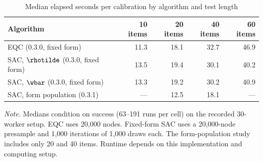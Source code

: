 \begin{table}[!htbp]
\centering
\caption{Median elapsed seconds per calibration by algorithm and test length}
\label{tab:runtime}
\small
\begin{tabular}{lrrrr}
\toprule
Algorithm & 10 items & 20 items & 40 items & 60 items \\
\midrule
EQC (0.3.0, fixed form) & 11.3 & 18.1 & 32.7 & 46.9 \\
SAC, $\rhotilde$ (0.3.0, fixed form) & 13.5 & 19.4 & 30.1 & 40.2 \\
SAC, $\wbar$ (0.3.0, fixed form) & 13.3 & 19.2 & 30.2 & 40.9 \\
SAC, form population (0.3.1) & --- & 12.5 & 18.1 & --- \\
\bottomrule
\end{tabular}

\smallskip
\begin{minipage}{0.95\textwidth}
\footnotesize
\emph{Note.} Medians condition on success (63--191 runs per cell) on the recorded 30-worker setup. EQC uses 20,000 nodes. Fixed-form SAC uses a 20,000-node presample and 1,000 iterations of 1,000 draws each. The form-population study includes only 20 and 40 items. Runtime depends on this implementation and computing setup.
\end{minipage}
\end{table}
